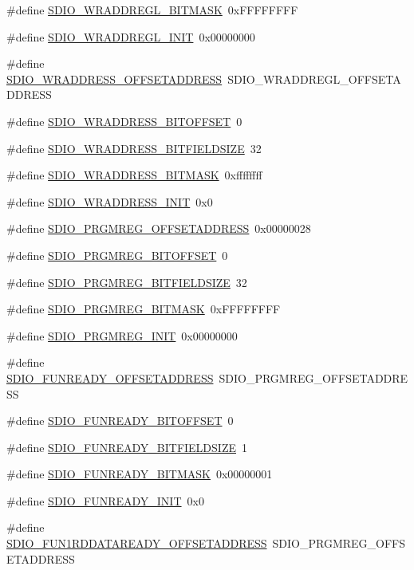 \begin{DoxyCompactItemize}
\item 
\#define \hyperlink{a00571_add1a25723af17ee47387fe4a6d1a3c8e}{SDIO\_\-WRADDREGL\_\-BITMASK}~0xFFFFFFFF
\item 
\#define \hyperlink{a00571_a90d036cf5f37c625857eaee89797d8b5}{SDIO\_\-WRADDREGL\_\-INIT}~0x00000000
\item 
\#define \hyperlink{a00571_acbe191ee91abebdaa4e445b7c7913516}{SDIO\_\-WRADDRESS\_\-OFFSETADDRESS}~SDIO\_\-WRADDREGL\_\-OFFSETADDRESS
\item 
\#define \hyperlink{a00571_a037f92d603c2bba7f5ebd0144cec74cb}{SDIO\_\-WRADDRESS\_\-BITOFFSET}~0
\item 
\#define \hyperlink{a00571_a16648ce8d0a32a06606e7e27f24634db}{SDIO\_\-WRADDRESS\_\-BITFIELDSIZE}~32
\item 
\#define \hyperlink{a00571_a3cf97ccdc9336c6cdb67c12526afdadb}{SDIO\_\-WRADDRESS\_\-BITMASK}~0xffffffff
\item 
\#define \hyperlink{a00571_a391ed00f714f565adc17e8aa69fc3b58}{SDIO\_\-WRADDRESS\_\-INIT}~0x0
\item 
\#define \hyperlink{a00571_ab06b4fb8478f7fc59049a1da81903807}{SDIO\_\-PRGMREG\_\-OFFSETADDRESS}~0x00000028
\item 
\#define \hyperlink{a00571_a1d6a0832f98e8cf6ee6e92461b2a02a9}{SDIO\_\-PRGMREG\_\-BITOFFSET}~0
\item 
\#define \hyperlink{a00571_ab0e381cd32fb631ea174d30b188cac78}{SDIO\_\-PRGMREG\_\-BITFIELDSIZE}~32
\item 
\#define \hyperlink{a00571_a8eb6f791d4b3e507355b3e5a467003bc}{SDIO\_\-PRGMREG\_\-BITMASK}~0xFFFFFFFF
\item 
\#define \hyperlink{a00571_a4fd22f40b66fad965293780c3cae885f}{SDIO\_\-PRGMREG\_\-INIT}~0x00000000
\item 
\#define \hyperlink{a00571_a785953df52b693fb60a69f747bb66a30}{SDIO\_\-FUNREADY\_\-OFFSETADDRESS}~SDIO\_\-PRGMREG\_\-OFFSETADDRESS
\item 
\#define \hyperlink{a00571_a7112dd3153449a0fb87f46e43d82dc93}{SDIO\_\-FUNREADY\_\-BITOFFSET}~0
\item 
\#define \hyperlink{a00571_a2f199cfd6b576a648f5fda3ca8be1a5e}{SDIO\_\-FUNREADY\_\-BITFIELDSIZE}~1
\item 
\#define \hyperlink{a00571_a41d6e2b163a6dc1fd2afc8ebdf1b8d5f}{SDIO\_\-FUNREADY\_\-BITMASK}~0x00000001
\item 
\#define \hyperlink{a00571_a52e4482a522aa32806c4d4fb08d7bb33}{SDIO\_\-FUNREADY\_\-INIT}~0x0
\item 
\#define \hyperlink{a00571_a8a8634d3e7ffb6cc76361592e44854a4}{SDIO\_\-FUN1RDDATAREADY\_\-OFFSETADDRESS}~SDIO\_\-PRGMREG\_\-OFFSETADDRESS

\end{DoxyCompactItemize}
